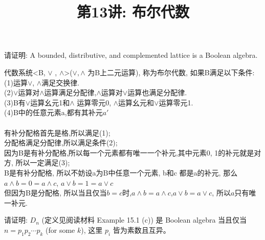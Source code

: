 \documentclass[a4paper, justified]{tufte-handout}
\title{第13讲: 布尔代数}
\date{\zhtoday} %
\begin{document}
\maketitle
\noplagiarism %
\begin{abstract}
\end{abstract}
\beginrequired

\begin{problem}[Definition]
请证明: A bounded, distributive, and complemented lattice is a Boolean algebra.
\end{problem}

\begin{solution}
  代数系统<B, $\lor$ , $\land$>($\lor, \land$ 为B上二元运算), 称为布尔代数, 如果B满足以下条件:\\
  (1)运算$\lor$, $\land$满足交换律.\\
  (2)$\lor$运算对$\land$运算满足分配律,$\land$运算对$\lor$运算也满足分配律.\\
  (3)B有$\lor$运算幺元1和$\land$ 运算零元0, $\land$运算幺元和$\lor$运算零元1.\\
  (4)B中的任意元素a,都有其补元$a'$\\
  \\
  有补分配格首先是格,所以满足(1);\\
  分配格满足分配律,所以满足条件(2);\\
  因为B是有补分配格,所以每一个元素都有唯一一个补元,其中元素0, 1的补元就是对方, 所以一定满足(3);\\
  B是有补分配格, 所以不妨设a为B中任意一个元素, b和c 都是a的补元, 那么$a \land b = 0 = a \land c$, $a \lor b = 1 = a \lor c$\\
  但因为B是分配格, 所以当且仅当$b = c$时,$a \land b = a \land c$,$a \lor b = a \lor c$, 所以$a$只有唯一补元.

\end{solution}

\begin{problem}[$D_{n}$]
请证明: $D_{n}$ (定义见阅读材料 Example 15.1 (c))
是 Boolean algebra 当且仅当 $n = p_1 p_2 \cdots p_k$ (for some $k$),
这里 $p_i$ 皆为素数且互异。
\end{problem}
\end{document}
